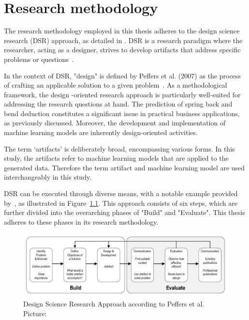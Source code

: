 \chapter{Research methodology}\label{ch:research-methodology}

The research methodology employed in this thesis adheres to the design science research (DSR) approach, as detailed
in \cite[p. 17]{rennenkampff_managementitagilitaetentwicklung_2015}.
DSR is a research paradigm where the researcher, acting as a designer, strives to develop artifacts that address
specific problems or questions~\cite[p. 10]{hevner_designscienceresearch_2010}.

In the context of DSR, "design" is defined by Peffers et al. (2007) as the process of crafting an applicable solution
to a given problem~\cite[p.47]{peffers_designscienceresearch_2007}.
As a methodological framework, the design -oriented research approach is particularly well-suited for addressing the
research questions at hand.
The prediction of spring back and bend deduction constitutes a significant issue in practical business applications,
as previously discussed.
Moreover, the development and implementation of machine learning models are inherently design-oriented activities.

The term `artifacts' is deliberately broad, encompassing various forms.
In this study, the artifacts refer to machine learning models that are applied to the generated data.
Therefore the term artifact and machine learning model are used interchangeably in this study.

DSR can be executed through diverse means, with a notable example provided by~\cite{peffers_designscienceresearch_2007},
as illustrated in Figure~\ref{fig:dsr_process}.
This approach consists of six steps, which are further divided into the overarching phases of "Build" and "Evaluate".
This thesis adheres to these phases in its research methodology.

\begin{figure}[h]
    \begin{tcolorbox}[arc=0pt,boxrule=0.5pt]
        \centering
        \includegraphics[width=1\linewidth]{chap3/images/dsr_process}
        \caption[DSR Process]{Design Science Research Approach according to Peffers et al.
        Picture:~\cite[p. 72]{sonnenberg_evaluationpatternsdesign_2012}}
        \label{fig:dsr_process}
    \end{tcolorbox}
\end{figure}

